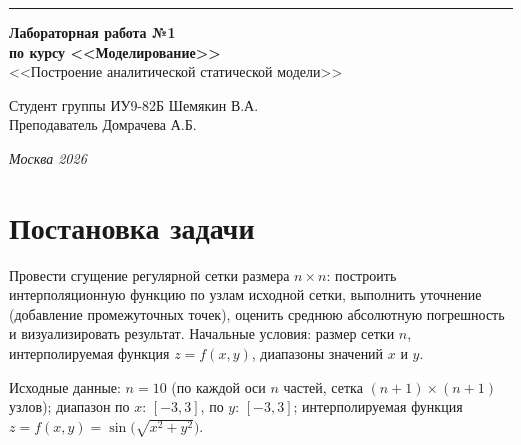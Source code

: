 \documentclass[a4paper, 14pt]{extarticle}
\begin{document}
\begin{titlepage}
\vspace*{-16pt}
\hspace{30pt}\rule{0.866\textwidth}{0.4pt}
  
\vspace{11em}

\begin{center}
\Large {\bf Лабораторная работа №1} \\ 
\large {\bf по курсу <<Моделирование>>} \\
\large <<Построение аналитической статической модели>> 
\end{center}\normalsize

\vspace{8em}


\begin{flushright}
  {Студент группы ИУ9-82Б Шемякин В.А. \hspace*{15pt}\\ 
  \vspace{2ex}
  Преподаватель Домрачева А.Б.\hspace*{15pt}}
\end{flushright}

\bigskip

\vfill
 

\begin{center}
\textsl{Москва 2026}
\end{center}
\end{titlepage}

\renewcommand{\ttdefault}{pcr}

\setlength{\tabcolsep}{3pt}
\newpage
\setcounter{page}{2}
\section{Постановка задачи}

Провести сгущение регулярной сетки размера $n\times n$: построить интерполяционную функцию по узлам исходной сетки, выполнить уточнение (добавление промежуточных точек), оценить среднюю абсолютную погрешность и визуализировать результат. Начальные условия: размер сетки $n$, интерполируемая функция $z = f(x, y)$, диапазоны значений $x$ и $y$.

Исходные данные: $n = 10$ (по каждой оси $n$ частей, сетка $(n+1) \times (n+1)$ узлов); диапазон по $x$: $[-3, 3]$, по $y$: $[-3, 3]$; интерполируемая функция $z = f(x, y) = \sin\bigl(\sqrt{x^2 + y^2}\bigr)$. 
\end{document}
